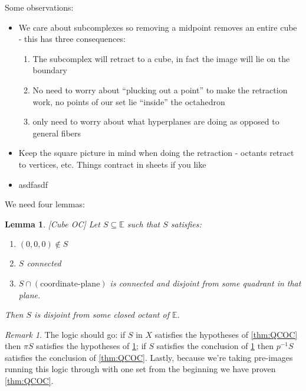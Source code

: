\documentclass{article}
\theoremstyle{mystyle}
\newtheorem{lem}{Lemma}[section]
\theoremstyle{remark}
\newtheorem{rmk}{Remark}[section]
\begin{document}
Some observations:
\begin{itemize}
	\item We care about subcomplexes so removing a midpoint removes an entire cube - this has three consequences:
		\begin{enumerate}
			\item The subcomplex will retract to a cube, in fact the image will lie on the boundary
			\item No need to worry about ``plucking out a point'' to make the retraction work, no points of our set lie ``inside'' the octahedron
			\item only need to worry about what hyperplanes are doing as opposed to general fibers
		\end{enumerate}
	\item Keep the square picture in mind when doing the retraction - octants retract to vertices, etc. Things contract in sheets if you like
	\item asdfasdf
\end{itemize}

We need four lemmas:

\begin{lem}
	\label{lem:cubeOC}
	[Cube OC] Let \(S \subseteq \mathbb{E}  \) such that \(S\) satisfies: 
	\begin{enumerate}
		\item \((0,0,0) \not\in S\) 
		\item \(S\) connected
		\item \(S \cap (\text{coordinate-plane})\) is connected and disjoint from some quadrant in that plane.
	\end{enumerate}
	Then \(S\) is disjoint from some closed octant of \(\mathbb{E}\). 
\end{lem}

\begin{rmk}
The logic should go: if \(S\) in \(X\) satisfies the hypotheses of \ref{thm:QCOC} then \(\pi S\) satisfies the hypotheses of \ref{lem:cubeOC}; if \(S\) satisfies the conclusion of \ref{lem:cubeOC} then \(p^{-1} S\) satisfies the conclusion of \ref{thm:QCOC}. Lastly, because we're taking pre-images running this logic through with one set from the beginning we have proven \ref{thm:QCOC}.
\end{rmk}



\end{document}
